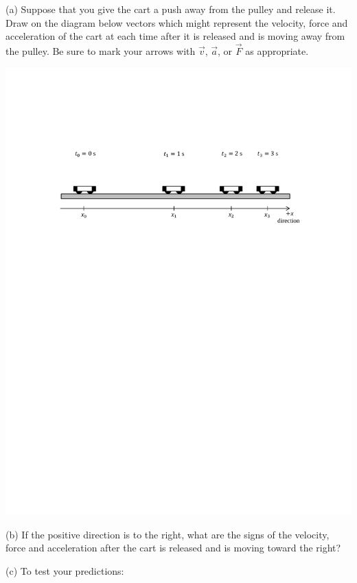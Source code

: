(a) Suppose that you give the cart a push away from the pulley and release it. Draw on the diagram below vectors which might represent the velocity, force and acceleration of the cart at each time after it is released and is moving away from the pulley. Be sure to mark your arrows with \( {\vec v} \), \( {\vec a} \), or \( {\vec F} \)
as appropriate.

\vspace{0.3cm}
{\par\centering \includegraphics{force2/carts_slowing.pdf} \par}
\vspace{0.3cm}

(b) If the positive direction is to the right, what are the signs of the velocity, force and acceleration after the cart is released and is moving toward
the right?
\vspace{10mm}

(c) To test your predictions: 

